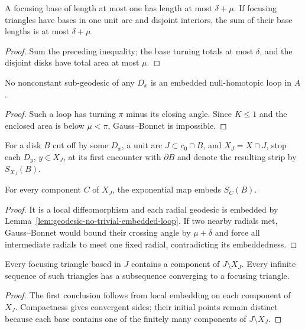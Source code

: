 \begin{corollary}
\label{cor:focusing-triangle-base-bound-collection}
\label{muepsbd}
A focusing base of length at most one has length at most $\delta+\mu$. If
focusing triangles have bases in one unit arc and disjoint interiors, the sum
of their base lengths is at most $\delta+\mu$.
\end{corollary}
\begin{proof}
\sketch Sum the preceding inequality; the base turning totals at most $\delta$, and
the disjoint disks have total area at most $\mu$.
\end{proof}

\begin{lemma}
\label{lem:geodesic-no-trivial-embedded-loop}
\label{noloops}
No nonconstant sub-geodesic of any $D_x$ is an embedded null-homotopic loop in
$A$.
\end{lemma}
\begin{proof}
\sketch Such a loop has turning $\pi$ minus its closing angle. Since $K\le1$
and the enclosed area is below $\mu<\pi$, Gauss--Bonnet is impossible.
\end{proof}

For a disk $B$ cut off by some $D_x$, a unit arc $J\subset c_0\cap B$, and
$X_J=X\cap J$, stop each $D_y$, $y\in X_J$, at its first encounter with
$\partial B$ and denote the resulting strip by $S_{X_J}(B)$.

\begin{claim}
\label{claim:local-embedding-of-geodesic-family}
\label{locemb}
For every component $C$ of $X_J$, the exponential map embeds $S_C(B)$.
\end{claim}
\begin{proof}
\sketch It is a local diffeomorphism and each radial geodesic is embedded by
Lemma~\ref{lem:geodesic-no-trivial-embedded-loop}. If two nearby radials met,
Gauss--Bonnet would bound their crossing angle by $\mu+\delta$ and force all
intermediate radials to meet one fixed radial, contradicting its embeddedness.
\end{proof}

\begin{claim}
\label{claim:focusing-triangle-limit-existence}
\label{limittri}
Every focusing triangle based in $J$ contains a component of $J\setminus X_J$.
Every infinite sequence of such triangles has a subsequence converging to a
focusing triangle.
\end{claim}
\begin{proof}
\sketch The first conclusion follows from local embedding on each component of $X_J$.
Compactness gives convergent sides; their initial points remain distinct because
each base contains one of the finitely many components of $J\setminus X_J$.
\end{proof}

